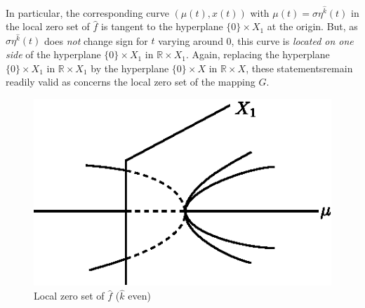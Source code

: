 In particular, the corresponding curve $(\mu(t), x(t))$ with $\mu(t) =
\sigma \eta^{\hat{k}}(t)$ in the local zero set of $\hat{f}$ is
tangent to the hyperplane $\{0\} \times X_{1}$ at the origin. But, as
$\sigma \eta^{\hat{k}}(t)$ does {\em not} change sign for $t$ varying
around 0, this curve is {\em located on one side} of the hyperplane
$\{0\} \times X_{1}$ in $\mathbb{R} \times X_{1}$. Again, replacing
the hyperplane $\{0\} \times X_{1}$ in $\mathbb{R} \times X_{1}$ by
the hyperplane $\{0\} \times X$ in $\mathbb{R} \times X$, these
statements\pageoriginale remain readily valid as concerns the local
zero set of the mapping $G$.
\begin{figure}[H]
\centering
\includegraphics{figure/fig76-3.3_1.eps}
\caption{Local zero set of $\hat{f}$ ($\hat{k}$ even)}
\end{figure}

